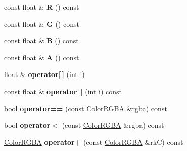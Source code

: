 \begin{DoxyCompactItemize}
\item 
const float \& {\bfseries R} () const \hypertarget{class_magnum_1_1_color_r_g_b_a_adb01c476bd9363e0182a33f7aca89d45}{}\label{class_magnum_1_1_color_r_g_b_a_adb01c476bd9363e0182a33f7aca89d45}

\item 
const float \& {\bfseries G} () const \hypertarget{class_magnum_1_1_color_r_g_b_a_a57822b276924a64569b05ace59e98ad6}{}\label{class_magnum_1_1_color_r_g_b_a_a57822b276924a64569b05ace59e98ad6}

\item 
const float \& {\bfseries B} () const \hypertarget{class_magnum_1_1_color_r_g_b_a_a6fbe6fe34991371fdd89d5df8e801fe6}{}\label{class_magnum_1_1_color_r_g_b_a_a6fbe6fe34991371fdd89d5df8e801fe6}

\item 
const float \& {\bfseries A} () const \hypertarget{class_magnum_1_1_color_r_g_b_a_a2dca1e07903daaefd7826a6ca31311c5}{}\label{class_magnum_1_1_color_r_g_b_a_a2dca1e07903daaefd7826a6ca31311c5}

\item 
float \& {\bfseries operator\mbox{[}$\,$\mbox{]}} (int i)\hypertarget{class_magnum_1_1_color_r_g_b_a_abd43c29183f5cd08f6f2dd283a2e0377}{}\label{class_magnum_1_1_color_r_g_b_a_abd43c29183f5cd08f6f2dd283a2e0377}

\item 
const float \& {\bfseries operator\mbox{[}$\,$\mbox{]}} (int i) const \hypertarget{class_magnum_1_1_color_r_g_b_a_a8c525e612d23f1b1dc18378d5df1736c}{}\label{class_magnum_1_1_color_r_g_b_a_a8c525e612d23f1b1dc18378d5df1736c}

\item 
bool {\bfseries operator==} (const \hyperlink{class_magnum_1_1_color_r_g_b_a}{Color\+R\+G\+BA} \&rgba) const \hypertarget{class_magnum_1_1_color_r_g_b_a_ad4c8764938b1b6cf31bb48416b7dd903}{}\label{class_magnum_1_1_color_r_g_b_a_ad4c8764938b1b6cf31bb48416b7dd903}

\item 
bool {\bfseries operator$<$} (const \hyperlink{class_magnum_1_1_color_r_g_b_a}{Color\+R\+G\+BA} \&rgba) const \hypertarget{class_magnum_1_1_color_r_g_b_a_a95a192162ae78d489d821ded3b1ee950}{}\label{class_magnum_1_1_color_r_g_b_a_a95a192162ae78d489d821ded3b1ee950}

\item 
\hyperlink{class_magnum_1_1_color_r_g_b_a}{Color\+R\+G\+BA} {\bfseries operator+} (const \hyperlink{class_magnum_1_1_color_r_g_b_a}{Color\+R\+G\+BA} \&rkC) const \hypertarget{class_magnum_1_1_color_r_g_b_a_a4eda8517cfca8a093aaaa8925b5fe8b0}{}\label{class_magnum_1_1_color_r_g_b_a_a4eda8517cfca8a093aaaa8925b5fe8b0}


\end{DoxyCompactItemize}
